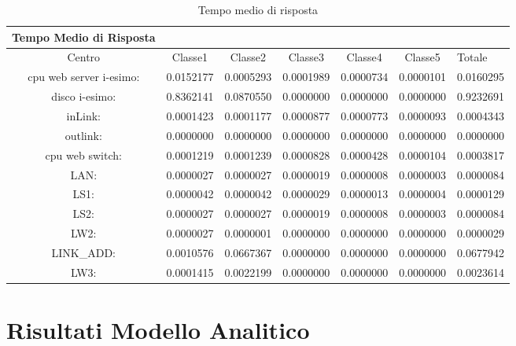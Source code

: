 \begin{table}[htbp]
\begin{center}
\begin{tabular}{||c|c|c|c|c|c||}
\hline
Tempo Medio di Risposta\\
\hline
Centro &Classe1 &Classe2 &Classe3 &Classe4 &Classe5 &Totale\\
\hline
\hline
 cpu web server i-esimo: 	&0.0152177	&0.0005293	&0.0001989	&0.0000734	&0.0000101	&0.0160295\\
\hline
 disco i-esimo: 	&0.8362141	&0.0870550	&0.0000000	&0.0000000	&0.0000000	&0.9232691\\
\hline
 inLink: 	&0.0001423	&0.0001177	&0.0000877	&0.0000773	&0.0000093	&0.0004343\\
\hline
 outlink: 	&0.0000000	&0.0000000	&0.0000000	&0.0000000	&0.0000000	&0.0000000\\
\hline
 cpu web switch: 	&0.0001219	&0.0001239	&0.0000828	&0.0000428	&0.0000104	&0.0003817\\
\hline
 LAN: 	&0.0000027	&0.0000027	&0.0000019	&0.0000008	&0.0000003	&0.0000084\\
\hline
 LS1: 	&0.0000042	&0.0000042	&0.0000029	&0.0000013	&0.0000004	&0.0000129\\
\hline
 LS2: 	&0.0000027	&0.0000027	&0.0000019	&0.0000008	&0.0000003	&0.0000084\\
\hline
 LW2: 	&0.0000027	&0.0000001	&0.0000000	&0.0000000	&0.0000000	&0.0000029\\
\hline
 LINK_ADD: 	&0.0010576	&0.0667367	&0.0000000	&0.0000000	&0.0000000	&0.0677942\\
\hline
 LW3: 	&0.0001415	&0.0022199	&0.0000000	&0.0000000	&0.0000000	&0.0023614\\
\hline
\end{tabular}
\end{center}
\caption{Tempo medio di risposta}
\label{tempomediodirisposta}
\end{table}

\section{Risultati Modello Analitico}
